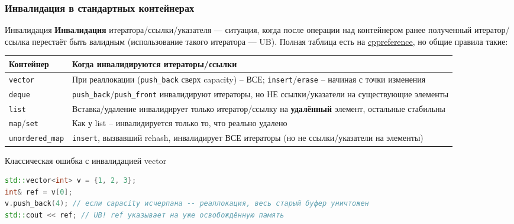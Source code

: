 \subsubsection{Инвалидация в стандартных контейнерах}
\begin{definition}{Инвалидация}{}
\textbf{Инвалидация} итератора/ссылки/указателя --- ситуация, когда после операции над контейнером ранее полученный итератор/ссылка перестаёт быть валидным (использование такого итератора --- UB). Полная таблица есть на \href{https://en.cppreference.com/w/cpp/container}{cppreference}, но общие правила такие:
\end{definition}
\begin{center}
\begin{tabular}{|l|l|}
\hline
\textbf{Контейнер} & \textbf{Когда инвалидируются итераторы/ссылки} \\
\hline
\texttt{vector} & При реаллокации (\texttt{push\_back} сверх capacity) -- ВСЕ; \texttt{insert}/\texttt{erase} -- начиная с точки изменения \\
\texttt{deque} & \texttt{push\_back}/\texttt{push\_front} инвалидируют итераторы, но НЕ ссылки/указатели на существующие элементы \\
\texttt{list} & Вставка/удаление инвалидирует только итератор/ссылку на \textbf{удалённый} элемент, остальные стабильны \\
\texttt{map}/\texttt{set} & Как у list -- инвалидируется только то, что реально удалено \\
\texttt{unordered\_map} & \texttt{insert}, вызвавший rehash, инвалидирует ВСЕ итераторы (но не ссылки/указатели на элементы) \\
\hline
\end{tabular}
\end{center}
\begin{implementation}{Классическая ошибка с инвалидацией vector}{}
\begin{lstlisting}[language=C++]
std::vector<int> v = {1, 2, 3};
int& ref = v[0];
v.push_back(4); // если capacity исчерпана -- реаллокация, весь старый буфер уничтожен
std::cout << ref; // UB! ref указывает на уже освобождённую память
\end{lstlisting}
\end{implementation}
